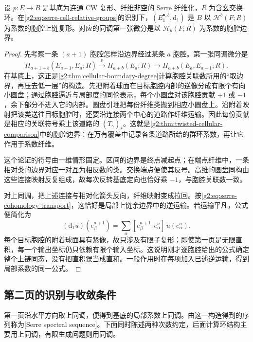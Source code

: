 \begin{proposition}\label{g2:prop:serre-cellular-first-differential}
	设 \(p:E\to B\) 是基底为连通 CW 复形、纤维非空的 Serre 纤维化，\(R\) 为含幺交换环。在\eqref{g2:eq:serre-cell-relative-groups}的识别下，\((E_1^{\bullet,b},\mathrm d_1)\) 是 \(B\) 以 \(\mathcal H^b(F;R)\) 为系数的胞腔上链复形。对应的同调第一张微分是以 \(\mathcal H_b(F;R)\) 为系数的胞腔边界。
\end{proposition}
\begin{proof}
	先考察一条 \((a+1)\) 胞腔怎样沿边界经过某条 \(a\) 胞腔。第一张同调微分是
	\[
		H_{a+1+b}(E_{a+1},E_a;R)\xrightarrow{\partial}H_{a+b}(E_a;R)
		\longrightarrow H_{a+b}(E_a,E_{a-1};R).
	\]
	在基底上，这正是\cref{g2:thm:cellular-boundary-degree}计算胞腔关联数所用的“取边界，再压去低一层”的构造。先把附着球面在目标胞腔内部的逆像分成有限个有向小圆盘；通过胞腔逼近与局部度的同伦表示，每个小圆盘对该胞腔贡献 \(+1\) 或 \(-1\)，余下部分不进入它的内部。圆盘引理把每份纤维类搬到相应小圆盘上。沿附着映射把该类送往目标胞腔时，还要沿连接两个中心的道路作纤维运输。因此每份贡献是相应的关联符号乘上该道路的 \((T_\gamma)_*\)。这就是\cref{g2:thm:twisted-cellular-comparison}中的胞腔边界：在万有覆盖中记录各条道路所给的群环系数，再让它作用于系数纤维。

	这个论证的符号由一维情形固定。区间的边界是终点减起点；在端点纤维中，一条相对类的边界对应一对互为相反数的类。交换端点便使其反号。高维的圆盘同构由这些连接映射反复组成，故每次反转基底定向也恰好乘 \(-1\)，与胞腔关联数一致。

	对上同调，把上述连接与相对化箭头反向，纤维映射变成拉回。按\eqref{g2:eq:serre-cohomology-transport}，这恰好是局部上链余边界中的逆运输。若运输平凡，公式便简化为
	\[
		(\mathrm d_1u)(e_\beta^{a+1})=\sum_\alpha[e_\beta^{a+1}:e_\alpha^a]\,u(e_\alpha^a).
	\]
	每个目标胞腔的附着球面具有紧像，故只涉及有限子复形；即使第一页是无限直积，每一个输出坐标仍只依赖有限个输入坐标。这说明刚才逐胞腔给出的公式确定整个上链同态，没有把直积误当成直和。一般作用时在每项加入已述逆运输，得到局部系数的同一公式。
\end{proof}

\subsection{第二页的识别与收敛条件}
\label{g2:subsec:1101:04}

第一页沿水平方向取上同调，便得到基底的局部系数上同调。由这一构造得到的序列称为[Serre spectral sequence]。下面同时陈述两种次数约定，后面计算环结构主要用上同调，有限生成问题则用同调。

